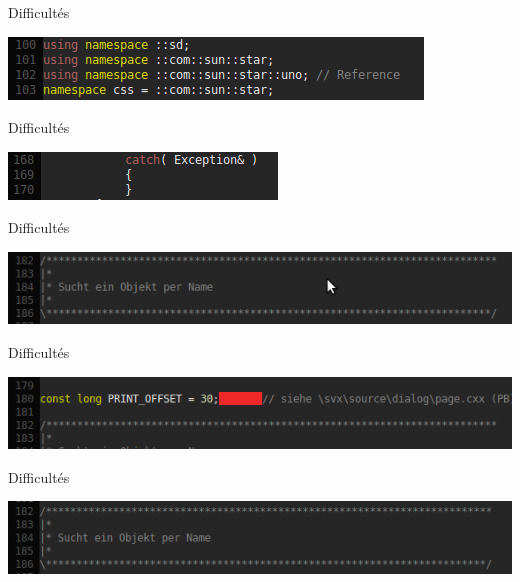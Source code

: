 \documentclass[handout]{beamer}
\begin{document}
\begin{frame}{Difficultés}
    \begin{center}
    \includegraphics[scale=0.5]{images/screenshot_032.png}
    \end{center}    
\end{frame}

\begin{frame}{Difficultés}
    \begin{center}
    \includegraphics[scale=0.5]{images/screenshot_033.png}
    \end{center}    
\end{frame}

\begin{frame}{Difficultés}
    \begin{center}
    \includegraphics[scale=0.5]{images/screenshot_034.png}
    \end{center}    
\end{frame}

\begin{frame}{Difficultés}
    \begin{center}
    \includegraphics[scale=0.5]{images/screenshot_035.png}
    \end{center}    
\end{frame}

\begin{frame}{Difficultés}
    \begin{center}
    \includegraphics[scale=0.5]{images/screenshot_036.png}
    \end{center}    
\end{frame}
\end{document}
